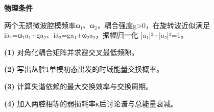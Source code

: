 \textbf{物理条件}\par 两个无损微波腔模频率ω₁、ω₂，耦合强度g>0，在旋转波近似满足 iȧ₁=ω₁a₁+ga₂、iȧ₂=ga₁+ω₂a₂，振幅归一化 |a₁|²+|a₂|²=1。
\par\noindent\textbf{(1)} 对角化耦合矩阵并求避交叉最低频隙。
\par\noindent\textbf{(2)} 写出从腔1单模初态出发的时域能量交换概率。
\par\noindent\textbf{(3)} 计算失谐依赖的最大交换效率与交换周期。
\par\noindent\textbf{(4)} 加入两腔相等的弱损耗率κ后讨论谱与总能量衰减。
